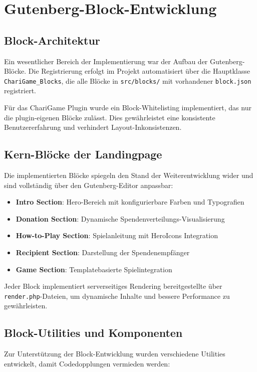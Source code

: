 \section{Gutenberg-Block-Entwicklung}
\subsection{Block-Architektur}
Ein wesentlicher Bereich der Implementierung war der Aufbau der Gutenberg-Blöcke.
Die Registrierung erfolgt im Projekt automatisiert über die Hauptklasse \texttt{ChariGame\_Blocks}, die alle Blöcke in \texttt{src/blocks/} mit vorhandener \texttt{block.json} registriert.

Für das ChariGame Plugin wurde ein Block-Whitelisting implementiert, das nur die plugin-eigenen Blöcke zulässt.
Dies gewährleistet eine konsistente Benutzererfahrung und verhindert Layout-Inkonsistenzen.

\subsection{Kern-Blöcke der Landingpage}
Die implementierten Blöcke spiegeln den Stand der Weiterentwicklung wider und sind vollständig über den Gutenberg-Editor anpassbar:

\begin{itemize}
    \item \textbf{Intro Section}: Hero-Bereich mit konfigurierbare Farben und Typografien
    \item \textbf{Donation Section}: Dynamische Spendenverteilungs-Visualisierung
    \item \textbf{How-to-Play Section}: Spielanleitung mit HeroIcons Integration
    \item \textbf{Recipient Section}: Darstellung der Spendenempfänger
    \item \textbf{Game Section}: Templatebasierte Spielintegration
\end{itemize}

Jeder Block implementiert serverseitiges Rendering bereitgestellte über \texttt{render.php}-Dateien, um dynamische Inhalte und bessere Performance zu gewährleisten.

\subsection{Block-Utilities und Komponenten}
Zur Unterstützung der Block-Entwicklung wurden verschiedene Utilities entwickelt, damit Codedopplungen vermieden werden:

